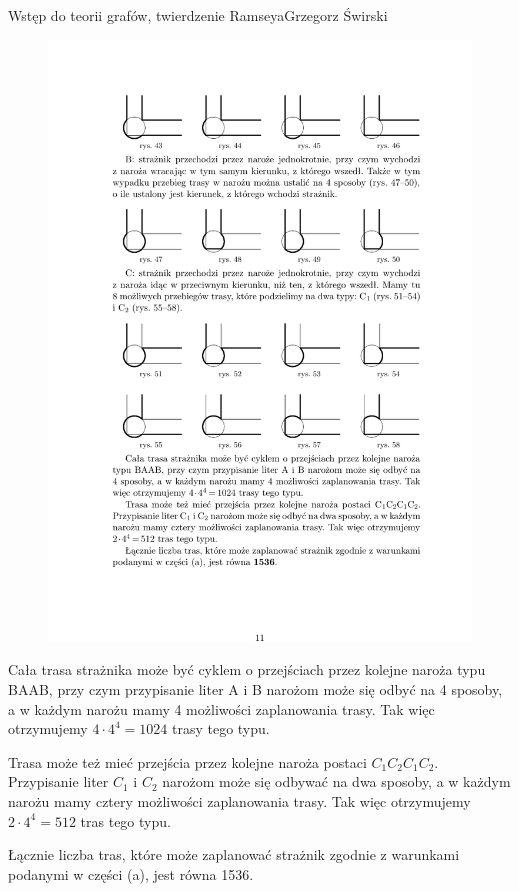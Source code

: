 \begin{referat}{Wstęp do teorii grafów, twierdzenie Ramseya}{Grzegorz Świrski}
\begin{figure}[!h]
\begin{flushright}
  \includegraphics[scale=1]{./swirski/ex6d.pdf}
  \end{flushright}
\end{figure}

Cała trasa strażnika może być cyklem o przejściach przez kolejne naroża typu BAAB, przy czym przypisanie liter A i B narożom może się odbyć na 4 sposoby, a w każdym narożu mamy 4 możliwości zaplanowania trasy. Tak więc otrzymujemy $4 \cdot 4^4 = 1024$ trasy tego typu.

Trasa może też mieć przejścia przez kolejne naroża postaci $C_1C_2C_1C_2$. Przypisanie liter $C_1$ i $C_2$ narożom może się odbywać na dwa sposoby, a w każdym narożu mamy cztery możliwości zaplanowania trasy. Tak więc otrzymujemy $2 \cdot 4^4 = 512$ tras tego typu.

Łącznie liczba tras, które może zaplanować strażnik zgodnie z warunkami
podanymi w części (a), jest równa 1536.


\end{referat}
